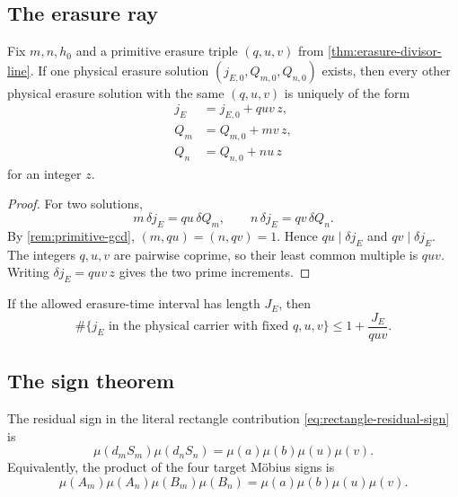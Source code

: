 \subsection{The erasure ray}

\begin{theorem}
\label{thm:erasure-ray}
Fix \(m,n,h_0\) and a primitive erasure triple \((q,u,v)\) from
\cref{thm:erasure-divisor-line}.  If one physical erasure solution
\((j_{E,0},Q_{m,0},Q_{n,0})\) exists, then every other physical erasure
solution with the same \((q,u,v)\) is uniquely of the form
\begin{align}
 j_E&=j_{E,0}+quv\,z,
 \label{eq:erasure-time-ray}\\
 Q_m&=Q_{m,0}+mv\,z,
 \label{eq:erasure-Qm-ray}\\
 Q_n&=Q_{n,0}+nu\,z
 \label{eq:erasure-Qn-ray}
\end{align}
for an integer \(z\).
\end{theorem}

\begin{proof}
For two solutions,
\[
 m\,\delta j_E=qu\,\delta Q_m,\qquad
 n\,\delta j_E=qv\,\delta Q_n.
\]
By \cref{rem:primitive-gcd}, \((m,qu)=(n,qv)=1\).  Hence
\(qu\mid\delta j_E\) and \(qv\mid\delta j_E\).  The integers \(q,u,v\)
are pairwise coprime, so their least common multiple is \(quv\).
Writing \(\delta j_E=quv\,z\) gives the two prime increments.
\end{proof}

\begin{corollary}
\label{cor:erasure-census}
If the allowed erasure-time interval has length \(J_E\), then
\begin{equation}
 \#\{j_E\text{ in the physical carrier with fixed }q,u,v\}
 \le 1+\frac{J_E}{quv}.
 \label{eq:erasure-census}
\end{equation}
\end{corollary}

\subsection{The sign theorem}

\begin{theorem}
\label{thm:primitive-cofactor-sign}
The residual sign in the literal rectangle contribution
\eqref{eq:rectangle-residual-sign} is
\begin{equation}
 \boxed{
 \mu(d_mS_m)\mu(d_nS_n)
 =
 \mu(a)\mu(b)\mu(u)\mu(v).}
 \label{eq:primitive-cofactor-sign}
\end{equation}
Equivalently, the product of the four target M\"obius signs is
\begin{equation}
 \boxed{
 \mu(A_m)\mu(A_n)\mu(B_m)\mu(B_n)
 =
 \mu(a)\mu(b)\mu(u)\mu(v).}
 \label{eq:four-target-sign}
\end{equation}
\end{theorem}

